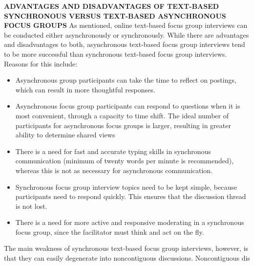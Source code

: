 \documentclass[a4]{article}
\begin{document}
\vspace{0.5cm}
{\large\textbf{ADVANTAGES AND DISADVANTAGES OF TEXT-BASED SYNCHRONOUS VERSUS TEXT-BASED ASYNCHRONOUS FOCUS GROUPS}}
\vspace{0.5cm}
As mentioned, online text-based focus group interviews can be conducted either asynchronously or synchronously. While there are advantages and disadvantages to both, asynchronous text-based focus group interviews tend to be more successful than synchronous text-based focus group interviews. Reasons for this include:
\begin{itemize}
	\item 
	Asynchronous group participants can take the time to reflect on postings, which can result in more thoughtful responses. 
	\item
	Asynchronous focus group participants can respond to questions when it is most convenient, through a capacity to time shift.
	The ideal number of participants for asynchronous focus groups is larger, resulting in greater ability to determine shared views 
	\item
	There is a need for fast and accurate typing skills in synchronous communication (minimum of twenty words per minute is recommended), whereas this is not as necessary for asynchronous communication.
	\item
	Synchronous focus group interview topics need to be kept simple, because participants need to respond quickly. This ensures that the discussion thread is not
	lost. 
	\item
	There is a need for more active and responsive moderating in a synchronous
	focus group, since the facilitator must think and act on the fly.
\end{itemize}


The main weakness of synchronous text-based focus group interviews, however, is that they can easily degenerate into noncontiguous discussions. Noncontiguous dis
\end{document}
